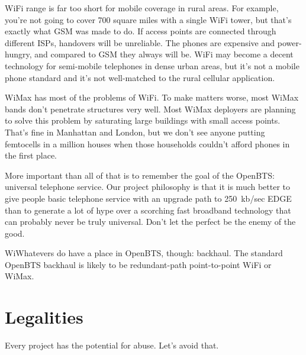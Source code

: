 \documentclass[11pt]{book}
\begin{document}
WiFi range is far too short for mobile coverage in rural areas.  For example, you're not going to cover 700 square miles with a single WiFi tower, but that's exactly what GSM was made to do.  If access points are connected through different ISPs, handovers will be unreliable. The phones are expensive and power-hungry, and compared to GSM they always will be.  WiFi may become a decent technology for semi-mobile telephones in dense urban areas, but it's not a mobile phone standard and it's not well-matched to the rural cellular application.

WiMax has most of the problems of WiFi. To make matters worse, most WiMax bands don't penetrate structures very well.  Most WiMax deployers are planning to solve this problem by saturating large buildings with small access points.  That's fine in Manhattan and London, but we don't see anyone putting femtocells in a million houses when those households couldn't afford phones in the first place.

More important than all of that is to remember the goal of the OpenBTS: universal telephone service.  Our project philosophy is that it is much better to give people basic telephone service with an upgrade path to 250~kb/sec EDGE than to generate a lot of hype over a scorching fast broadband technology that can probably never be truly universal.  Don't let the perfect be the enemy of the good.

WiWhatevers do have a place in OpenBTS, though: backhaul.  The standard OpenBTS backhaul is likely to be redundant-path point-to-point WiFi or WiMax.



\section{Legalities}
Every project has the potential for abuse.  Let's avoid that.
\end{document}

